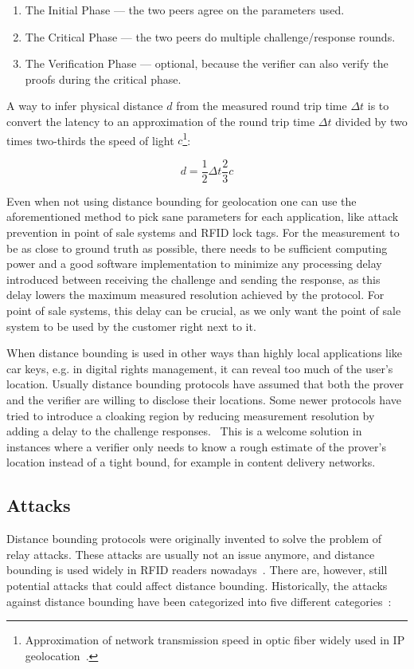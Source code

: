 \begin{enumerate}
  \item The Initial Phase --- the two peers agree on the parameters used.
  \item The Critical Phase --- the two peers do multiple challenge/response rounds.
  \item The Verification Phase --- optional, because the verifier can also verify the proofs during the critical phase.
\end{enumerate}

A way to infer physical distance \(d\) from the measured round trip time \(\Delta t\) is to convert the latency to an approximation of the round trip time \(\Delta t\) divided by two times two-thirds the speed of light \(c\)\footnote{Approximation of network transmission speed in optic fiber widely used in IP geolocation~\cite{Candela2020-am}.}:

\begin{equation*}
  d = \frac{1}{2}\Delta t \frac{2}{3}c
\end{equation*}

Even when not using distance bounding for geolocation one can use the aforementioned method to pick sane parameters for each application, like attack prevention in point of sale systems and RFID lock tags. For the measurement to be as close to ground truth as possible, there needs to be sufficient computing power and a good software implementation to minimize any processing delay introduced between receiving the challenge and sending the response, as this delay lowers the maximum measured resolution achieved by the protocol. For point of sale systems, this delay can be crucial, as we only want the point of sale system to be used by the customer right next to it.

When distance bounding is used in other ways than highly local applications like car keys, e.g. in digital rights management, it can reveal too much of the user's location. Usually distance bounding protocols have assumed that both the prover and the verifier are willing to disclose their locations. Some newer protocols have tried to introduce a cloaking region by reducing measurement resolution by adding a delay to the challenge responses.~\cite{Molina-Martinez2018-nw} This is a welcome solution in instances where a verifier only needs to know a rough estimate of the prover's location instead of a tight bound, for example in content delivery networks.

\subsection{Attacks}
Distance bounding protocols were originally invented to solve the problem of relay attacks. These attacks are usually not an issue anymore, and distance bounding is used widely in RFID readers nowadays~\cite{Nikov2008-vv}. There are, however, still potential attacks that could affect distance bounding. Historically, the attacks against distance bounding have been categorized into five different categories~\cite{Boureanu_undated-bn}:

